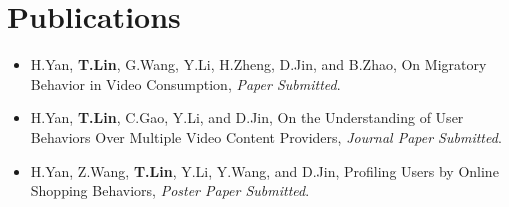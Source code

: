 \documentclass[letterpaper,11pt]{article}
\makeatletter
\newcommand{\resumeSubheadinghonor}[3]{
  \vspace{-1pt}\item
    \begin{tabular*}{0.97\textwidth}{l@{\extracolsep{\fill}}r}
      \textbf{#1} {#2}\\
      ~~\textit{\small#3}\\
    \end{tabular*}\vspace{-5pt}
}
\newcommand{\sectionwithbox}[1]{
  \section{\colorbox[rgb]{0.8,0.8,0.8}{{#1}}}
}
\newcommand{\resumeSubheadingPublication}[1]{
  \vspace{-1pt}\item
      {#1}
    \vspace{-5pt}
}
\newcommand{\resumeSubHeadingListStart}{\begin{itemize}[leftmargin=*]}
\newcommand{\resumeSubHeadingListEnd}{\end{itemize}}
\makeatother
\begin{document}
    



\sectionwithbox{Publications}
  \resumeSubHeadingListStart
	\resumeSubheadingPublication{H.Yan, \textbf{T.Lin}, G.Wang, Y.Li, H.Zheng, D.Jin, and B.Zhao, On Migratory Behavior in Video Consumption, \emph{Paper Submitted}.}
	\resumeSubheadingPublication{H.Yan, \textbf{T.Lin}, C.Gao, Y.Li, and D.Jin, On the Understanding of User Behaviors Over Multiple Video Content Providers, \emph{Journal Paper Submitted}.}
	\resumeSubheadingPublication{H.Yan, Z.Wang, \textbf{T.Lin}, Y.Li, Y.Wang, and D.Jin, Profiling Users by Online Shopping Behaviors, \emph{Poster Paper Submitted}.}
  \resumeSubHeadingListEnd
  
  
\end{document}
